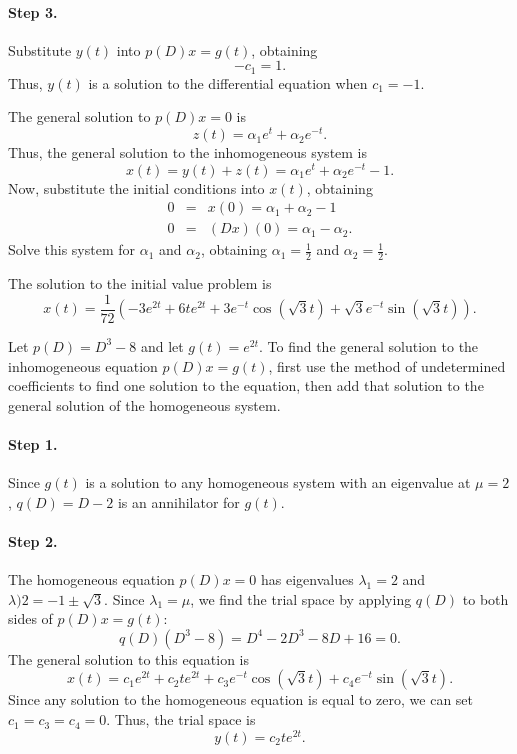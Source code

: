 \paragraph{Step 3.} Substitute $y(t)$ into $p(D)x = g(t)$, obtaining
\[
-c_1 = 1.
\]
Thus, $y(t)$ is a solution to the differential equation when $c_1 = -1$.

\para The general solution to $p(D)x = 0$ is
\[
z(t) = \alpha_1e^t + \alpha_2e^{-t}.
\]
Thus, the general solution to the inhomogeneous system is
\[
x(t) = y(t) + z(t) = \alpha_1e^t + \alpha_2e^{-t} - 1.
\]
Now, substitute the initial conditions into $x(t)$, obtaining
\[
\begin{array}{rcl}
0 & = & x(0) = \alpha_1 + \alpha_2 - 1 \\
0 & = & (Dx)(0) = \alpha_1 - \alpha_2.
\end{array}
\]
Solve this system for $\alpha_1$ and $\alpha_2$, obtaining
$\alpha_1 = \frac{1}{2}$ and $\alpha_2 = \frac{1}{2}$.

 \ans The solution to the initial value problem is
\[
x(t) = \frac{1}{72}(-3e^{2t} + 6te^{2t} + 3e^{-t}\cos(\sqrt{3}t)
+ \sqrt{3}e^{-t}\sin(\sqrt{3}t)).
\]

\soln Let $p(D) = D^3 - 8$ and let $g(t) = e^{2t}$.  To find the general
solution to the inhomogeneous equation $p(D)x = g(t)$, first use the
method of undetermined coefficients to find one solution to the
equation, then add that solution to the general solution of the
homogeneous system.

\paragraph{Step 1.} Since $g(t)$ is a solution to any homogeneous
system with an eigenvalue at $\mu = 2$, $q(D) = D - 2$ is an annihilator
for $g(t)$.

\paragraph{Step 2.} The homogeneous equation $p(D)x = 0$ has eigenvalues
$\lambda_1 = 2$ and $\lambda)2 = -1 \pm \sqrt{3}$.  Since $\lambda_1 =
\mu$, we find the trial space by applying $q(D)$ to both sides of
$p(D)x = g(t)$:
\[
q(D)(D^3 - 8) = D^4 - 2D^3 - 8D + 16 = 0.
\]
The general solution to this equation is
\[
x(t) = c_1e^{2t} + c_2te^{2t} + c_3e^{-t}\cos(\sqrt{3}t)
+ c_4e^{-t}\sin(\sqrt{3}t).
\]
Since any solution to the homogeneous equation is equal to zero, we can
set $c_1 = c_3 = c_4 = 0$.  Thus, the trial space is
\[
y(t) = c_2te^{2t}.
\]
